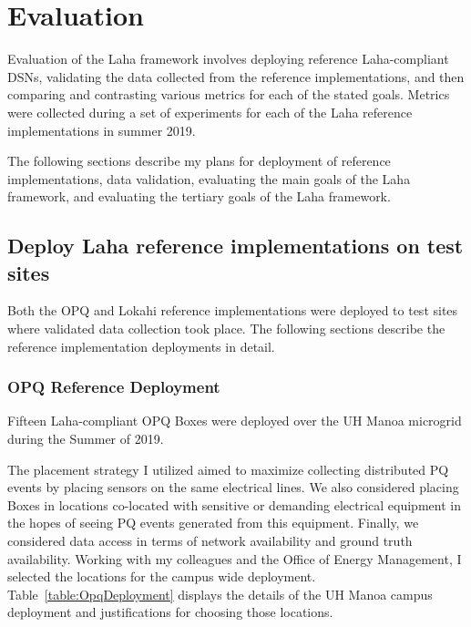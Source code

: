 \chapter{Evaluation}\label{ch:evaluation}
Evaluation of the Laha framework involves deploying reference Laha-compliant DSNs, validating the data collected from the reference implementations, and then comparing and contrasting various metrics for each of the stated goals. Metrics were collected during a set of experiments for each of the Laha reference implementations in summer 2019.

The following sections describe my plans for deployment of reference implementations, data validation, evaluating the main goals of the Laha framework, and evaluating the tertiary goals of the Laha framework.

\section{Deploy Laha reference implementations on test sites}\label{sec:deploy-laha-reference-implementations-on-test-sites}
Both the OPQ and Lokahi reference implementations were deployed to test sites where validated data collection took place. The following sections describe the reference implementation deployments in detail.

\subsection{OPQ Reference Deployment}\label{subsec:opq-reference-deployment}
Fifteen Laha-compliant OPQ Boxes were deployed over the UH Manoa microgrid during the Summer of 2019.

The placement strategy I utilized aimed to maximize collecting distributed PQ events by placing sensors on the same electrical lines. We also considered placing Boxes in locations co-located with sensitive or demanding electrical equipment in the hopes of seeing PQ events generated from this equipment. Finally, we considered data access in terms of network availability and ground truth availability. Working with my colleagues and the Office of Energy Management, I selected the locations for the campus wide deployment. Table~\ref{table:OpqDeployment} displays the details of the UH Manoa campus deployment and justifications for choosing those locations.

